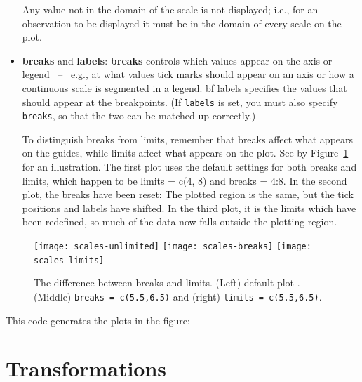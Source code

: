 \begin{itemize}
  Any value not in the domain of the scale is not displayed; i.e., for an observation to be displayed it must be in the domain of every scale on the plot.

  \item {\bf breaks} and {\bf labels}: {\bf breaks} controls which values appear on the axis or legend ~--~ e.g., at what values tick marks should appear on an axis or how a continuous scale is segmented in a legend.  {bf labels} specifies the values that should appear at the breakpoints. (If {\tt labels} is set, you must also specify {\tt breaks}, so that the two can be matched up correctly.)  

To distinguish breaks from limits, remember that breaks affect what appears on the guides, while limits affect what appears on the plot.  See by Figure~\ref{fig:breaks_vs_legends} for an illustration.  The first plot uses the default settings for both breaks and limits, which happen to be limits = c(4, 8) and breaks = 4:8.  In the second plot, the breaks have been reset: The plotted region is the same, but the tick positions and labels have shifted.  In the third plot, it is the limits which have been redefined, so much of the data now falls outside the plotting region. 
\end{itemize}

\begin{figure}[htbp]
  \centering
    \texttt{[image: scales-unlimited]}%
    \texttt{[image: scales-breaks]}%
    \texttt{[image: scales-limits]}
  \caption{The difference between breaks and limits.  (Left) default plot .  (Middle)  {\tt breaks = c(5.5,6.5)} and (right) {\tt limits = c(5.5,6.5)}.}
  \label{fig:breaks_vs_legends}
\end{figure}

This code generates the plots in the figure:

% 


\section{Transformations}
\label{sec:trans}

